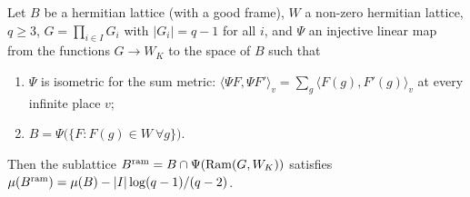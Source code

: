 \begin{lemma}\label{pf:sh-curv:induced}
Let $B$ be a hermitian lattice (with a good frame), $W$ a non-zero hermitian lattice, $q\ge3$, $G=\prod_{i\in I}G_i$ with
$|G_i|=q-1$ for all $i$, and $\Psi$ an injective linear map from the functions $G\to W_K$ to the space of $B$ such that
\begin{enumerate}[label=(\alph*)]
\item $\Psi$ is isometric for the sum metric: $\langle\Psi F,\Psi F'\rangle_v=\sum_{g}\langle F(g),F'(g)\rangle_v$ at every
infinite place $v$;
\item $B=\Psi\bigl(\{F:F(g)\in W\ \forall g\}\bigr)$.
\end{enumerate}
Then the sublattice $B^{\mathrm{ram}}=B\cap\Psi(\mathrm{Ram}(G,W_K))$ satisfies
$\mu(B^{\mathrm{ram}})=\mu(B)-|I|\log(q-1)/(q-2)$.
\end{lemma}

